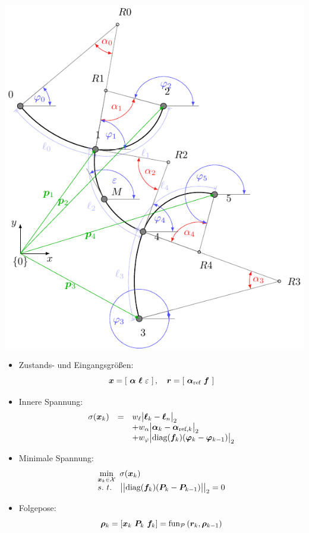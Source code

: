 \documentclass[10pt,a4paper]{article}
\begin{document}
	\includegraphics[scale=1]{pics/general_model/model_plain.pdf}

	\begin{itemize}
		\item Zustands- und Eingangsgrößen:
		$$
		\bm{x} = \left[~\bm{\alpha}~\bm{\ell}~\varepsilon~\right],~~~
		\bm{r} = \left[~\bm{\alpha}_{\textnormal{ref}}~\bm{f}~\right]
		$$
		
		\item Innere Spannung:
		$$
		\begin{array}{rcl}
		\sigma(\bm{x}_{k}) 
		&=&  w_\ell\big| \bm{\ell}_{k} - \bm{\ell}_n \big|_2 \\
		&&	+ w_\alpha\big| \bm{\alpha}_{k} - \bm{\alpha}_{\textnormal{ref},k} \big|_2 \\
		&&	+ w_\varphi \big| \textnormal{diag}(\bm{f}_k) ( \bm{\varphi}_{k} - \bm{\varphi}_{k-1}) \big|_2 \\
		\end{array}
		$$
		
		\item Minimale Spannung:
		$$
		\begin{array}{l}
		\displaystyle\min_{\bm{x}_k \in \mathcal{X}} ~ \sigma(\bm{x}_k) \\
		s.~t.~~~
		\big|\big|\textnormal{diag}(\bm{f}_k)(\bm{P}_{k} - \bm{P}_{k-1})\big|\big|_2 = 0
		\end{array}
		$$
		
		\item Folgepose:
		$$
		\bm{\rho}_k = [\bm{x}_k~\bm{P}_k~\bm{f}_k] = \textnormal{fun}_{\mathcal{P}}\left( \bm{r}_k, \bm{\rho}_{k-1} \right)
		$$
	\end{itemize}
	
\end{document}
